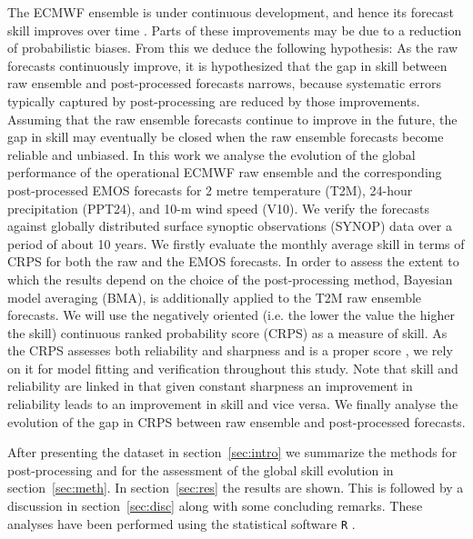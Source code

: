 The ECMWF ensemble is under continuous development, and hence its
forecast skill improves over time \citep{Buiz98,Buiz07,Rich13,Haid14}.
Parts of these improvements may be due to a reduction of probabilistic
biases. From this we deduce the following hypothesis: As the raw
forecasts continuously improve, it is hypothesized that the gap in
skill between raw ensemble and post-processed forecasts narrows,
because systematic errors typically captured by post-processing are
reduced 
by those improvements. 
Assuming that the raw ensemble forecasts continue to
improve in the future, the gap in skill may eventually be closed when
the raw ensemble forecasts become reliable and unbiased.  In this work
we analyse the evolution of the global performance of the operational
ECMWF raw ensemble and the corresponding post-processed EMOS forecasts
for 2 metre temperature (T2M), 24-hour precipitation (PPT24), and 10-m
wind speed (V10). We verify the forecasts against globally distributed
surface synoptic observations (SYNOP) data over a period of about 10
years. We firstly evaluate the monthly average skill in terms of CRPS
for both the raw and the EMOS forecasts. In order to assess the extent
to which the results depend on the choice of the post-processing
method, Bayesian model averaging (BMA), \citet{Raft05,Fra10} is
additionally applied to the T2M raw ensemble forecasts. We will use
the negatively oriented (i.e. the lower the value the higher the
skill) continuous ranked probability score (CRPS) \citep{Math76} as a
measure of skill. As the CRPS assesses both reliability and sharpness
and is a proper score \citep{Gneit07b}, we rely on it for model fitting
and verification throughout this study. Note that skill and
reliability are linked in that given constant sharpness an improvement
in reliability leads to an improvement in skill and vice versa. We
finally analyse the evolution of the gap in CRPS between raw ensemble
and post-processed forecasts.

After presenting the dataset in section~\ref{sec:intro} we summarize
the methods for post-processing and for the assessment of the global
skill evolution in section~\ref{sec:meth}. In section~\ref{sec:res}
the results are shown.  This is followed by a discussion in
section~\ref{sec:disc} along with some concluding
remarks. These
analyses have been performed using the statistical software \texttt{R}
\citep{R2013}.


